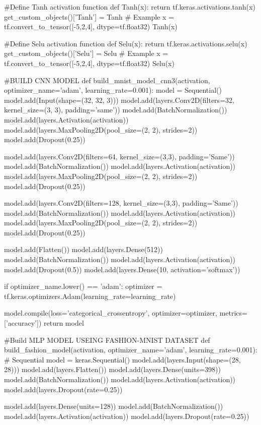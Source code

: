 #Define Tanh activation function
def Tanh(x):
    return tf.keras.activations.tanh(x)
get_custom_objects()['Tanh'] = Tanh
# Example
x = tf.convert_to_tensor([-5,2,4], dtype=tf.float32)
Tanh(x)

#Define Selu activation function
def Selu(x):
    return tf.keras.activations.selu(x)
get_custom_objects()['Selu'] = Selu
# Example
x = tf.convert_to_tensor([-5,2,4], dtype=tf.float32)
Selu(x)

#BUILD CNN MODEL 
def build_mnist_model_cnn3(activation, optimizer_name='adam', learning_rate=0.001):
    model = Sequential()
    model.add(Input(shape=(32, 32, 3)))
    model.add(layers.Conv2D(filters=32, kernel_size=(3, 3), padding='same'))
    model.add(BatchNormalization())
    model.add(layers.Activation(activation))
    model.add(layers.MaxPooling2D(pool_size=(2, 2), strides=2))
    model.add(Dropout(0.25))

    model.add(layers.Conv2D(filters=64, kernel_size=(3,3), padding='Same'))
    model.add(BatchNormalization())
    model.add(layers.Activation(activation))
    model.add(layers.MaxPooling2D(pool_size=(2, 2), strides=2))
    model.add(Dropout(0.25))

    model.add(layers.Conv2D(filters=128, kernel_size=(3,3), padding='Same'))
    model.add(BatchNormalization())
    model.add(layers.Activation(activation))
    model.add(layers.MaxPooling2D(pool_size=(2, 2), strides=2))
    model.add(Dropout(0.25))

    model.add(Flatten())
    model.add(layers.Dense(512))
    model.add(BatchNormalization())
    model.add(layers.Activation(activation))
    model.add(Dropout(0.5))
    model.add(layers.Dense(10, activation='softmax'))

    if optimizer_name.lower() == 'adam':
        optimizer = tf.keras.optimizers.Adam(learning_rate=learning_rate)

    model.compile(loss='categorical_crossentropy', optimizer=optimizer, metrics=['accuracy'])
    return model

#Build MLP MODEL USEING FASHION-MNIST DATASET
def build_fashion_model(activation, optimizer_name='adam', learning_rate=0.001):
    # Sequential 
    model = keras.Sequential()
    model.add(layers.Input(shape=(28, 28)))
    model.add(layers.Flatten())
    model.add(layers.Dense(units=398))
    model.add(BatchNormalization())
    model.add(layers.Activation(activation))
    model.add(layers.Dropout(rate=0.25)) 
    
    model.add(layers.Dense(units=128))
    model.add(BatchNormalization())
    model.add(layers.Activation(activation))
    model.add(layers.Dropout(rate=0.25))
    

